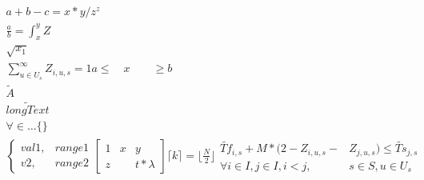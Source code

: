 \documentclass{article}
\begin{document}
    \begin{align}
        a + b - c = x * y / z ^z\\
        \frac{a}{b} = \int_x^y Z\\
        \sqrt{x_1}\\
        \sum_{u \in U_{s}}^{\infty} Z_{i,u,s} = 1

        a \leq \quad x \qquad \geq b\\
        
        \tilde{A}\\

        \widetilde{long Text}\\
        
        \forall \in \dots \{ \}\\

        \begin{cases}
            val1,  & range1\\
            v2,    & range2
        \end{cases}

        \left[
        \begin{matrix}
            1 & x & y\\
            z & & t*\lambda
        \end{matrix}    
        \right]

        \lceil k \rceil = \lfloor\frac{N}{2}\rfloor

        \begin{split}
            \widetilde{Tf}_{i,s} + M*(2-Z_{i,u,s}-&Z_{j,u,s}) \leq 
            \widetilde{Ts}_{j,s} \\
            \forall i \in I, j \in I, i < j,& s \in S, u \in U_{s}    
        \end{split}

    \end{align}
\end{document}
